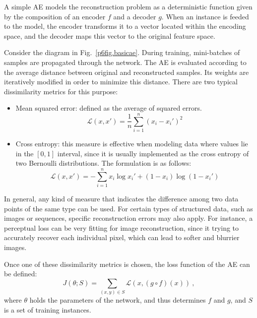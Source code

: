 A simple AE models the reconstruction problem as a deterministic function given by the composition of an encoder $f$ and a decoder $g$. When an instance is feeded to the model, the encoder transforms it to a vector located within the encoding space, and the decoder maps this vector to the original feature space.

Consider the diagram in Fig.~\ref{p6fig.basicae}. During training, mini-batches of samples are propagated through the network. The AE is evaluated according to the average distance between original and reconstructed samples. Its weights are iteratively modified in order to minimize this distance. There are two typical dissimilarity metrics for this purpose:

\begin{itemize}
  \item Mean squared error: defined as the average of squared errors.  \begin{equation}\mathcal L(x,x')=\frac 1 n \sum_{i=1}^n(x_i - x_i')^2\end{equation}
  \item Cross entropy: this measure is effective when modeling data where values lie in the $[0,1]$ interval, since it is usually implemented as the cross entropy of two Bernoulli distributions. The formulation is as follows: \begin{equation}\mathcal L(x,x')= -\sum_{i=1}^n x_i\log x_i'  + (1-x_i)\log(1-x_i') \end{equation}
\end{itemize}

In general, any kind of measure that indicates the difference among two data points of the same type can be used. For certain types of structured data, such as images or sequences, specific reconstruction errors may also apply. For instance, a perceptual loss  can be very fitting for image reconstruction, since it  trying to accurately recover each individual pixel, which can lead to softer and blurrier images.

Once one of these dissimilarity metrics is chosen, the loss function of the AE can be defined:
\begin{equation}
  J(\theta;S)=\sum_{(x,y)\in S} \mathcal L(x, (g\circ f)(x))~,
\end{equation}
where $\theta$ holds the parameters of the network, and thus determines $f$ and $g$, and $S$ is a set of training instances.

